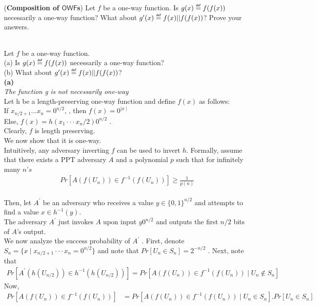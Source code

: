 \documentclass[11pt]{exam}
\newcommand{\bool}{\{0,1\}}
\newcommand{\owf}{\mathsf{OWF}}
\newcommand\myeq{\mathrel{\overset{\makebox[0pt]{\mbox{\normalfont\tiny\sffamily def}}}{=}}}
\begin{document}
\begin{questions}
\question[10]({\bf Composition of $\owf$s}) Let $f$ be a one-way function. Is $g(x)\myeq f(f(x))$ necessarily a one-way function? What about $g'(x)\myeq f(x)||f(f(x))$? Prove your answers.
\begin{solution}\\
    Let $f$ be a one-way function. \\
    (a) Is $g(x)\myeq f(f(x))$ necessarily a one-way function?\\
    (b) What about $g'(x)\myeq f(x)||f(f(x))$?\\
    \textbf{(a)} \\
    \emph{The function g is not necessarily one-way}\\
    Let h be a length-preserving one-way function and define $f(x)$ as follows:\\
    If $x_{n/2+1} ... x_n = 0^{n/2}$, , then $f(x) = 0^{\mid x\mid}$\\
    Else, $f(x) = h(x_1 · · · x_n/2 )0^{n/2}$ .\\
    Clearly, $f$ is length preserving. \\
    We now show that it is one-way.\\
    Intuitively, any adversary inverting $f$ can be used to invert $h$.
    Formally, assume that there exists a PPT adversary $A$ and a polynomial $p$ such that for infinitely many $n’s$
    \begin{align}
        Pr[A(f(U_n)) \in f^{-1}(f(U_n))] \geq \frac{1}{p(n)}
    \end{align}\\
    Then, let $A^{'}$ be an adversary who receives a value $y \in \bool^{n/2}$ and attempts to find a value $x \in h^{−1} (y)$.\\
    The adversary $A^{'}$ just invokes $A$ upon input $y0^{n/2}$ and outputs the first $n/2$ bits of $A$’s output.\\
    We now analyze the success probability of $A^'$ . First, denote $S_n = \{ x \mid x_{n/2+1} · · · x_n = 0^{n/2} \}$ and note that $Pr[U_n \in S_n ] = 2^{−n/2}$ . Next, note that
    \begin{align}
        Pr[A^{'}(h(U_{n/2} )) \in h^{-1}(h(U_{n/2} ))] = Pr[A(f(U_{n} )) \in f^{-1}(f (U_n )) \mid U_n \notin S_n ]
    \end{align}
    Now,\\
    \begin{align*}
        Pr[A(f (U_n )) \in f^{-1} (f (U_n ))] &= Pr[A(f (U_n )) \in f^{-1} (f (U_n )) \mid U_n \in S_n ] . Pr[U_n \in S_n ]\\

\end{align*}
\end{solution}
\end{questions}
\end{document}
